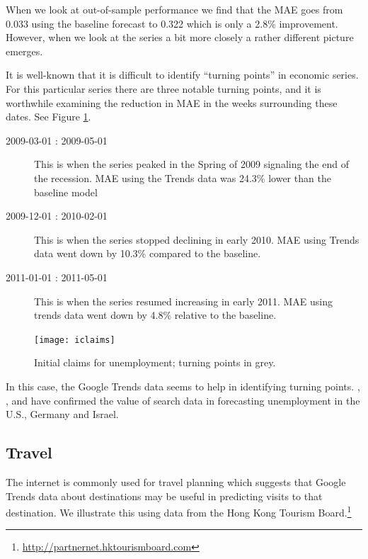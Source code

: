 \documentclass[12pt, oneside]{article}
\begin{document}
When we look at out-of-sample performance we find that the MAE goes
from 0.033 using the baseline forecast to 0.322 which is only a 2.8\%
improvement.  However, when we look at the series a bit more closely a
rather different picture emerges.

It is well-known that it is difficult to identify ``turning points''
in economic series.  For this particular series there are three
notable turning points, and it is worthwhile examining the reduction
in MAE in the weeks surrounding these dates.  See Figure
\ref{Fig:iclaims}.

\begin{description}
\item[2009-03-01 : 2009-05-01] This is when the series peaked in the
  Spring of 2009 signaling the end of the recession.  MAE using the
  Trends data was 24.3\% lower than the baseline model

\item[2009-12-01 : 2010-02-01] This is when the series stopped
  declining in early 2010. MAE using Trends data went down by 10.3\%
  compared to the baseline.

\item[2011-01-01 : 2011-05-01] This is when the series resumed
  increasing in early 2011.  MAE using trends data went down by 4.8\%
  relative to the baseline.
\end{description}

\begin{figure}[ht]
\begin{center}
\texttt{[image: iclaims]}
\caption{\label{Fig:iclaims} Initial claims for unemployment; turning
  points in grey.} 
\end{center}
\end{figure}


In this case, the Google Trends data seems to help in identifying
turning points.  \cite{Askitas10}, \cite{Suhoy09}, and \cite{Damuri10}
have confirmed the value of search data in forecasting unemployment in
the U.S., Germany and Israel.

\subsection{Travel} 
The internet is commonly used for travel planning which suggests that
Google Trends data about destinations may be useful in predicting
visits to that destination.  We illustrate this using data from the
Hong Kong Tourism Board.\footnote{\url{http://partnernet.hktourismboard.com}}
\end{document}
